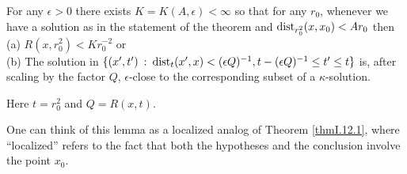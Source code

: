 \begin{lemma}
  \label{lem:kl-later-scalar-curvature-bounds-bigger-balls-from-curvature-volume-bounds-existence-kappa-solutions}
 \label{12.2lemma}
For any $\epsilon > 0$ there exists
$K = K(A, \epsilon) < \infty$
so that for any $r_0$,
whenever we have a solution as in the statement of the theorem
and $\operatorname{dist}_{r_0^2}(x, x_0) <
A r_0$ then  \\
(a) $R(x, r_0^2) < K r_0^{-2}$ or \\
(b) The solution in
$\{(x^\prime, t^\prime) \: : \: \operatorname{dist}_{t}(x^\prime, x) <
(\epsilon Q)^{-1}, t - (\epsilon Q)^{-1} \le t^\prime \le t \}$ is,
after scaling by the factor $Q$, $\epsilon$-close to the
corresponding subset of a $\kappa$-solution.

Here $t = r_0^2$ and
$Q = R(x,t)$.
\end{lemma}
\begin{remark}
  \label{rem:kl-later-scalar-curvature-bounds-bigger-balls-from-curvature-volume-bounds-structural-remark-thick-thin-geometry}

One can think of this lemma as a
localized analog of Theorem \ref{thmI.12.1}, where ``localized'' refers to
the fact that both the hypotheses and the conclusion involve the
point $x_0$.
\end{remark}

